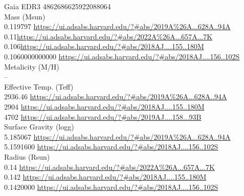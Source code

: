 Gaia EDR3 4862686625922088064\\
Mass (Msun)\\
0.119797 \url{https://ui.adsabs.harvard.edu/?#abs/2019A%26A...628A..94A}\\
0.11\url{https://ui.adsabs.harvard.edu/?#abs/2022A%26A...657A...7K}\\
0.106\url{https://ui.adsabs.harvard.edu/?#abs/2018AJ....155..180M}\\
0.1060000000000 \url{https://ui.adsabs.harvard.edu/?#abs/2018AJ....156..102S}\\
Metalicity (M/H)\\
--\\
Effective Temp. (Teff)\\
2936.46 \url{https://ui.adsabs.harvard.edu/?#abs/2019A%26A...628A..94A}\\
2904 \url{https://ui.adsabs.harvard.edu/?#abs/2018AJ....155..180M}\\
4702 \url{https://ui.adsabs.harvard.edu/?#abs/2019AJ....158...93B}\\
Surface Gravity (logg)\\
5.185067 \url{https://ui.adsabs.harvard.edu/?#abs/2019A%26A...628A..94A}\\
5.1591600 \url{https://ui.adsabs.harvard.edu/?#abs/2018AJ....156..102S}\\
Radius (Rsun)\\
0.14 \url{https://ui.adsabs.harvard.edu/?#abs/2022A%26A...657A...7K}\\
0.142 \url{https://ui.adsabs.harvard.edu/?#abs/2018AJ....155..180M}\\
0.1420000 \url{https://ui.adsabs.harvard.edu/?#abs/2018AJ....156..102S}\\